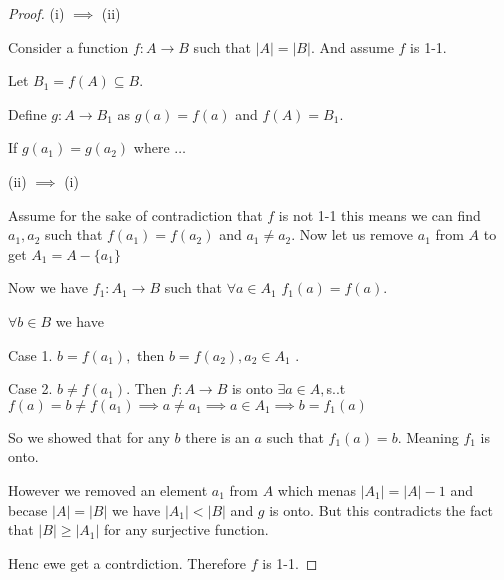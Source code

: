 \begin{proof}
    (i) $\implies$ (ii)

    Consider a function $f: A \rightarrow B$ such that $|A| = |B|$. And assume $f$ is 1-1.

    Let $B_1 = f(A) \subseteq B$.

    Define $g: A \rightarrow B_1$ as $g(a) = f(a)$ and $f(A) = B_1$.

    If $g(a_1) = g(a_2)$ where $ \dots$

    (ii) $\implies$ (i)

    Assume for the sake of contradiction that $f$ is not 1-1 this means we can find $a_1,a_2$ such that $f(a_1) = f(a_2)$ and $a_1 \ne a_2$. Now let us remove $a_1$ from $A$ to get $A_1 = A-\{a_1\}$

    Now we have $f_1: A_1 \rightarrow B$ such that $\forall a \in A_1$ $f_1(a) = f(a)$.

    
    $\forall b \in B$ we have

    Case 1. $b = f(a_1), $ then $b = f(a_2), a_2 \in A_1$ .

    Case 2. $b \ne f(a_1)$. Then $f:A \rightarrow B$ is onto $\exists a \in A,$s..t $f(a) = b \ne f(a_1) \implies a \ne a_1 \implies a \in A_1 \implies b = f_1(a)$ 

    So we showed that for any $b$ there is an $a$ such that $f_1(a) = b$. Meaning $f_1$ is onto.

    However we removed an element $a_1$ from $A$ which menas $|A_1| = |A| - 1$ and becase $|A| = |B|$ we have  $|A_1| < |B|$ and $g$ is onto. But this contradicts the fact that $|B| \ge |A_1|$ for any surjective function.

    Henc ewe get a contrdiction. Therefore $f$ is 1-1.

\end{proof}


